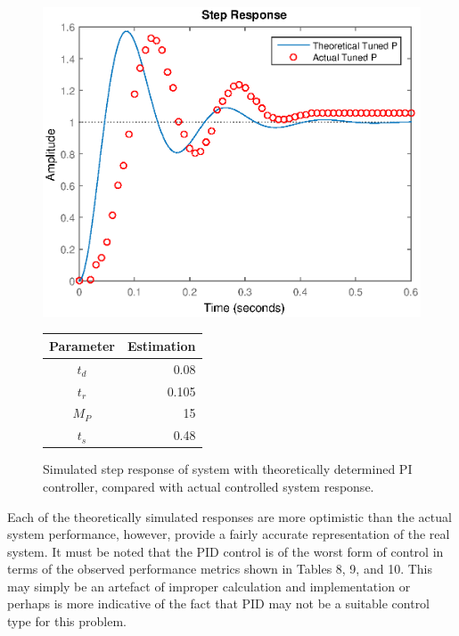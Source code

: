 \documentclass{article}
\begin{document}
\begin{figure}[H]
	\hspace{0.5cm}
	\begin{minipage}{7cm}
		\centering
		\includegraphics[scale=0.5]{fig17}
		\caption{Simulated step response of system with theoretically determined PI controller, compared with actual controlled system response.}
	\end{minipage}
	\hspace{1cm}
	\begin{minipage}{7cm}
		\begin{tabular}{cr}
			\toprule
			\textbf{Parameter} & \textbf{Estimation}\\
			\midrule
			$t_d$ & 0.08\\
			$t_r$ & 0.105\\
			$M_P$ & 15\\
			$t_s$ & 0.48\\
			\bottomrule
		\end{tabular}
	\end{minipage}
\end{figure}

Each of the theoretically simulated responses are more optimistic than the actual system performance, however, provide a fairly accurate representation of the real system. It must be noted that the PID control is of the worst form of control in terms of the observed performance metrics shown in Tables 8, 9, and 10. This may simply be an artefact of improper calculation and implementation or perhaps is more indicative of the fact that PID may not be a suitable control type for this problem.
\end{document}
